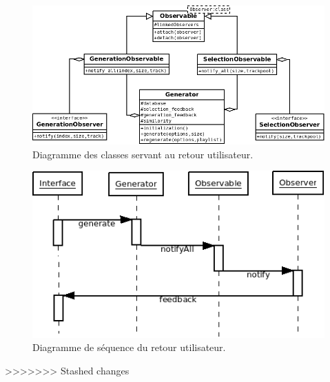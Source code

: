 \begin{figure}[H]
\includegraphics[width=\textwidth]{data/archi/feedback.png}
\caption{Diagramme des classes servant au retour utilisateur.}
\end{figure}

\begin{figure}[H]
\includegraphics[width=\textwidth]{data/archi/feedback_sequence.png}
\caption{Diagramme de séquence du retour utilisateur.}
\end{figure}
>>>>>>> Stashed changes
